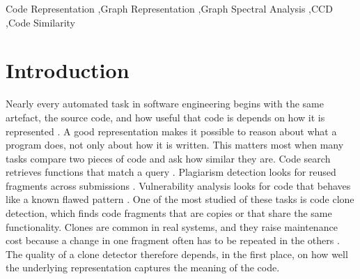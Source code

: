 \documentclass[authoryear,final,5p,times,twocolumn]{elsarticle}
\theoremstyle{plain}
\begin{document}
\begin{frontmatter}
\begin{abstract}

\end{abstract}


\begin{keyword}
Code Representation \sep Graph Representation \sep Graph Spectral Analysis  \sep CCD \sep Code Similarity
\end{keyword}

\end{frontmatter}


\section{Introduction}
\label{sec:introduction}
Nearly every automated task in software engineering begins with the same
artefact, the source code, and how useful that code is depends on how it is
represented \cite{allamanis2018survey}. A good representation makes it
possible to reason about what a program does, not only about how it is
written. This matters most when many tasks compare two pieces of code and
ask how similar they are. Code search retrieves functions that match a query
\cite{gu2018deepcs}. Plagiarism detection looks for reused fragments
across submissions \cite{schleimer2003winnowing}. Vulnerability analysis
looks for code that behaves like a known flawed pattern
\cite{zhou2019devign}. One of the most studied of these tasks is code
clone detection, which finds code fragments that are copies or that share
the same functionality. Clones are common in real systems, and they raise
maintenance cost because a change in one fragment often has to be repeated
in the others \cite{juergens2009clones,roy2007survey}. The quality of a
clone detector therefore depends, in the first place, on how well the
underlying representation captures the meaning of the code.
\end{document}
